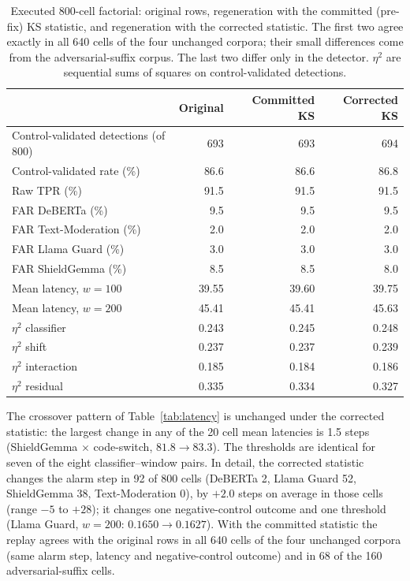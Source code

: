\documentclass{article}
\begin{document}
\begin{table}[h]
\centering
\small
\caption{Executed 800-cell factorial: original rows, regeneration with the committed (pre-fix) KS statistic, and regeneration with the corrected statistic. The first two agree exactly in all 640 cells of the four unchanged corpora; their small differences come from the adversarial-suffix corpus. The last two differ only in the detector. $\eta^2$ are sequential sums of squares on control-validated detections.}
\label{tab:regeneration}
\begin{tabular}{lrrr}
\toprule
 & \textbf{Original} & \textbf{Committed KS} & \textbf{Corrected KS} \\
\midrule
Control-validated detections (of 800) & 693 & 693 & 694 \\
Control-validated rate (\%) & 86.6 & 86.6 & 86.8 \\
Raw TPR (\%) & 91.5 & 91.5 & 91.5 \\
FAR DeBERTa (\%) & 9.5 & 9.5 & 9.5 \\
FAR Text-Moderation (\%) & 2.0 & 2.0 & 2.0 \\
FAR Llama Guard (\%) & 3.0 & 3.0 & 3.0 \\
FAR ShieldGemma (\%) & 8.5 & 8.5 & 8.0 \\
Mean latency, $w{=}100$ & 39.55 & 39.60 & 39.75 \\
Mean latency, $w{=}200$ & 45.41 & 45.41 & 45.63 \\
$\eta^2$ classifier & 0.243 & 0.245 & 0.248 \\
$\eta^2$ shift & 0.237 & 0.237 & 0.239 \\
$\eta^2$ interaction & 0.185 & 0.184 & 0.186 \\
$\eta^2$ residual & 0.335 & 0.334 & 0.327 \\
\bottomrule
\end{tabular}
\end{table}

The crossover pattern of Table~\ref{tab:latency} is unchanged under the corrected statistic: the largest change in any of the 20 cell mean latencies is 1.5 steps (ShieldGemma $\times$ code-switch, $81.8 \to 83.3$). The thresholds are identical for seven of the eight classifier--window pairs. In detail, the corrected statistic changes the alarm step in 92 of 800 cells (DeBERTa 2, Llama Guard 52, ShieldGemma 38, Text-Moderation 0), by $+2.0$ steps on average in those cells (range $-5$ to $+28$); it changes one negative-control outcome and one threshold (Llama Guard, $w{=}200$: $0.1650 \to 0.1627$). With the committed statistic the replay agrees with the original rows in all 640 cells of the four unchanged corpora (same alarm step, latency and negative-control outcome) and in 68 of the 160 adversarial-suffix cells.
\end{document}
